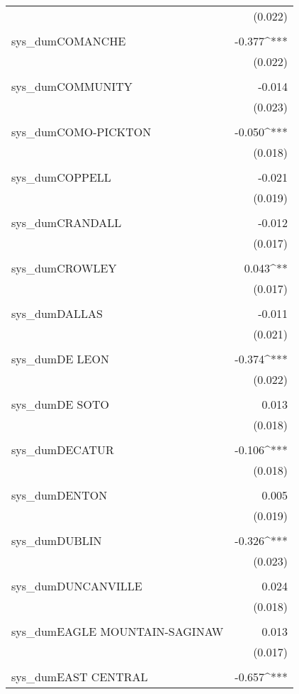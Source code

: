 \begin{table}[!htbp]
\begin{tabular}{@{\extracolsep{5pt}}lD{.}{.}{-3} }
  & (0.022) \\ 
  & \\ 
 sys\_dumCOMANCHE & -0.377^{***} \\ 
  & (0.022) \\ 
  & \\ 
 sys\_dumCOMMUNITY & -0.014 \\ 
  & (0.023) \\ 
  & \\ 
 sys\_dumCOMO-PICKTON & -0.050^{***} \\ 
  & (0.018) \\ 
  & \\ 
 sys\_dumCOPPELL & -0.021 \\ 
  & (0.019) \\ 
  & \\ 
 sys\_dumCRANDALL & -0.012 \\ 
  & (0.017) \\ 
  & \\ 
 sys\_dumCROWLEY & 0.043^{**} \\ 
  & (0.017) \\ 
  & \\ 
 sys\_dumDALLAS & -0.011 \\ 
  & (0.021) \\ 
  & \\ 
 sys\_dumDE LEON & -0.374^{***} \\ 
  & (0.022) \\ 
  & \\ 
 sys\_dumDE SOTO & 0.013 \\ 
  & (0.018) \\ 
  & \\ 
 sys\_dumDECATUR & -0.106^{***} \\ 
  & (0.018) \\ 
  & \\ 
 sys\_dumDENTON & 0.005 \\ 
  & (0.019) \\ 
  & \\ 
 sys\_dumDUBLIN & -0.326^{***} \\ 
  & (0.023) \\ 
  & \\ 
 sys\_dumDUNCANVILLE & 0.024 \\ 
  & (0.018) \\ 
  & \\ 
 sys\_dumEAGLE MOUNTAIN-SAGINAW & 0.013 \\ 
  & (0.017) \\ 
  & \\ 
 sys\_dumEAST CENTRAL & -0.657^{***} \\ 

\end{tabular}
\end{table}
